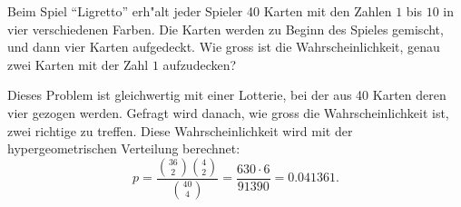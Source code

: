 Beim Spiel ``Ligretto'' erh"alt jeder Spieler 40 Karten mit den
Zahlen $1$ bis $10$ in vier verschiedenen Farben. Die Karten werden
zu Beginn des Spieles gemischt, und dann vier Karten aufgedeckt.
Wie gross ist die Wahrscheinlichkeit, genau zwei Karten mit der
Zahl $1$ aufzudecken?

\begin{loesung}
Dieses Problem ist gleichwertig mit einer Lotterie, bei der
aus 40 Karten deren vier gezogen werden. Gefragt wird danach,
wie gross die Wahrscheinlichkeit ist, zwei richtige zu treffen.
Diese Wahrscheinlichkeit wird mit der hypergeometrischen Verteilung
berechnet:
\[
p=\frac{\binom{36}{2}\binom{4}{2}}{\binom{40}{4}}
=\frac{630\cdot 6}{91390}=0.041361.
\]
\end{loesung}

